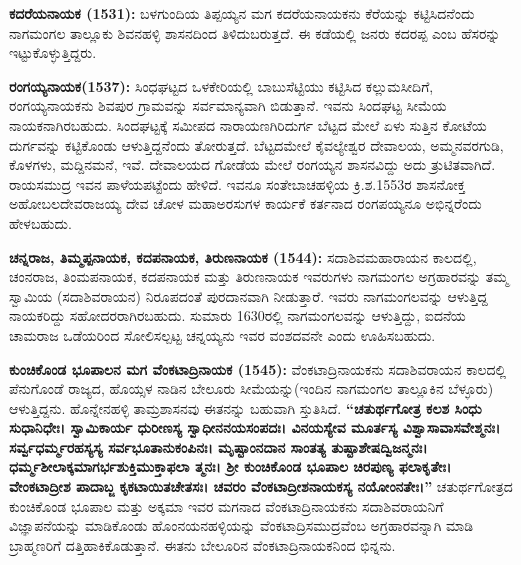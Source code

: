 \vskip 3pt

\textbf{ಕದರೆಯನಾಯಕ (1531):} ಬಳಗುಂದಿಯ ತಿಪ್ಪಯ್ಯನ ಮಗ ಕದರೆಯನಾಯಕನು ಕೆರೆಯನ್ನು ಕಟ್ಟಿಸಿದನೆಂದು ನಾಗಮಂಗಲ ತಾಲ್ಲೂಕು ಶಿವನಹಳ್ಳಿ ಶಾಸನದಿಂದ ತಿಳಿದುಬರುತ್ತದೆ. ಈ ಕಡೆಯಲ್ಲಿ ಜನರು ಕದರಪ್ಪ ಎಂಬ ಹೆಸರನ್ನು ಇಟ್ಟುಕೊಳ್ಳುತ್ತಿದ್ದರು.

\vskip 3pt

\textbf{ರಂಗಯ್ಯನಾಯಕ(1537):} ಸಿಂಧಘಟ್ಟದ ಒಳಕೇರಿಯಲ್ಲಿ ಬಾಬುಸೆಟ್ಟಿಯು ಕಟ್ಟಿಸಿದ ಕಲ್ಲುಮಸೀದಿಗೆ, ರಂಗಯ್ಯ\-ನಾಯಕನು ಶಿವಪುರ ಗ್ರಾಮವನ್ನು ಸರ್ವಮಾನ್ಯವಾಗಿ ಬಿಡುತ್ತಾನೆ. ಇವನು ಸಿಂದಘಟ್ಟ ಸೀಮೆಯ ನಾಯಕನಾಗಿರಬಹುದು. ಸಿಂದಘಟ್ಟಕ್ಕೆ ಸಮೀಪದ ನಾರಾಯಣಗಿರಿದುರ್ಗ ಬೆಟ್ಟದ ಮೇಲೆ ಏಳು ಸುತ್ತಿನ ಕೋಟೆಯ ದುರ್ಗವನ್ನು ಕಟ್ಟಿಕೊಂಡು ಆಳುತ್ತಿದ್ದನೆಂದು ತೋರುತ್ತದೆ. ಬೆಟ್ಟದಮೇಲೆ ಕೈವಲ್ಯೇಶ್ವರ ದೇವಾಲಯ, ಅಮ್ಮನವರಗುಡಿ, ಕೊಳಗಳು, ಮದ್ದಿನಮನೆ, ಇವೆ. ದೇವಾಲಯದ ಗೋಡೆಯ ಮೇಲೆ ರಂಗಯ್ಯನ ಶಾಸನವಿದ್ದು ಅದು ತ್ರುಟಿತವಾಗಿದೆ. ರಾಯಸಮುದ್ರ ಇವನ ಪಾಳೆಯಪಟ್ಟೆಂದು ಹೇಳಿದೆ. ಇವನೂ ಸಂತೇಬಾಚಹಳ್ಳಿಯ ಕ್ರಿ.ಶ.1553ರ ಶಾಸನೋಕ್ತ ಅಹೋಬಲದೇವರಾಜಯ್ಯ ದೇವ ಚೋಳ ಮಹಾಅರಸುಗಳ ಕಾರ್ಯಕೆ ಕರ್ತನಾದ ರಂಗಪಯ್ಯನೂ ಅಭಿನ್ನರೆಂದು ಹೇಳಬಹುದು.

\vskip 3pt

\textbf{ಚನ್ನರಾಜ, ತಿಮ್ಮಪ್ಪನಾಯಕ, ಕದಪನಾಯಕ, ತಿರುಣನಾಯಕ (1544):} ಸದಾಶಿವಮಹಾರಾಯನ ಕಾಲದಲ್ಲಿ, ಚಂನರಾಜ, ತಿಂಮಪನಾಯಕ, ಕದಪನಾಯಕ ಮತ್ತು ತಿರುಣನಾಯಕ ಇವರುಗಳು ನಾಗಮಂಗಲ ಅಗ್ರಹಾರವನ್ನು ತಮ್ಮ ಸ್ವಾಮಿಯ (ಸದಾಶಿವರಾಯನ) ನಿರೂಪದಂತೆ ಪುರದಾನವಾಗಿ ನೀಡುತ್ತಾರೆ. ಇವರು ನಾಗಮಂಗಲವನ್ನು ಆಳುತ್ತಿದ್ದ ನಾಯಕರಿದ್ದು ಸಹೋದರರಾಗಿರಬಹುದು. ಸುಮಾರು 1630ರಲ್ಲಿ ನಾಗಮಂಗಲವನ್ನು ಆಳುತ್ತಿದ್ದು, ಐದನೆಯ ಚಾಮರಾಜ ಒಡೆಯರಿಂದ ಸೋಲಿಸಲ್ಪಟ್ಟ ಚನ್ನಯ್ಯನು ಇವರ ವಂಶದವನೇ ಎಂದು ಊಹಿಸಬಹುದು.

\textbf{ಕುಂಚಿಕೊಂಡ ಭೂಪಾಲನ ಮಗ ವೆಂಕಟಾದ್ರಿನಾಯಕ (1545):} ವೆಂಕಟಾದ್ರಿನಾಯಕನು ಸದಾಶಿವರಾಯನ ಕಾಲದಲ್ಲಿ ಪೆನುಗೊಂಡೆ ರಾಜ್ಯದ, ಹೊಯ್ಸಳ ನಾಡಿನ ಬೇಲೂರು ಸೀಮೆಯನ್ನು(ಇಂದಿನ ನಾಗಮಂಗಲ ತಾಲ್ಲೂಕಿನ ಬೆಳ್ಳೂರು) ಆಳುತ್ತಿದ್ದನು. ಹೊನ್ನೇನಹಳ್ಳಿ ತಾಮ್ರಶಾಸನವು ಈತನನ್ನು ಬಹುವಾಗಿ ಸ್ತುತಿಸಿದೆ. \textbf{“ಚತುರ್ಥಗೋತ್ರ ಕಲಶ ಸಿಂಧು ಸುಧಾನಿಧೇಃ। ಸ್ವಾಮಿಕಾರ್ಯ ಧುರೀಣಸ್ಯ ಸ್ವಾಧೀನನಯಸಂಪದಃ। ವಿನಯಸ್ಯೇವ ಮೂರ್ತಸ್ಯ ವಿಶ್ವಾಸಾವಾಸವೇಶ್ಮನಃ। ಸರ್ವ್ವಧರ್ಮ್ಮರಹಸ್ಯಸ್ಯ ಸರ್ವಭೂತಾನುಕಂಪಿನಃ। ಮೃಷ್ಟಾಂನದಾನ ಸಾಂತತ್ಯ ತುಷ್ಟಾಶೇಷದ್ವಿಜನ್ಮನಃ। ಧರ್ಮ್ಮಶೀಲಾಕ್ಕಮಾಗರ್ಭಶುಕ್ತಿಮುಕ್ತಾಫಲಾ ತ್ಮನಃ। ಶ‍್ರೀ ಕುಂಚಿಕೊಂಡ ಭೂಪಾಲ ಚಿರಪುಣ್ಯ ಫಲಾಕೃತೇಃ। ವೇಂಕಟಾದ್ರೀಶ ಪಾದಾಬ್ಜ ಕೃಕಟಾಯಿತಚೇತಸಃ। ಚವರಂ\general{\break } ವೆಂಕಟಾದ್ರೀಶನಾಯಕಸ್ಯ ನಯೋಂನತೇಃ।”} ಚತುರ್ಥಗೋತ್ರದ ಕುಂಚಿಕೊಂಡ ಭೂಪಾಲ ಮತ್ತು ಅಕ್ಕಮಾ ಇವರ ಮಗನಾದ ವೆಂಕಟಾದ್ರಿನಾಯಕನು ಸದಾಶಿವರಾಯನಿಗೆ ವಿಜ್ಞಾಪನೆಯನ್ನು ಮಾಡಿಕೊಂಡು ಹೊಂನಯನಹಳ್ಳಿಯನ್ನು ವೆಂಕಟಾದ್ರಿಸಮುದ್ರ\-ವೆಂಬ ಅಗ್ರಹಾರವನ್ನಾಗಿ ಮಾಡಿ ಬ್ರಾಹ್ಮಣರಿಗೆ ದತ್ತಿಹಾಕಿಕೊಡುತ್ತಾನೆ. ಈತನು ಬೇಲೂರಿನ ವೆಂಕಟಾದ್ರಿನಾಯಕನಿಂದ ಭಿನ್ನನು.

